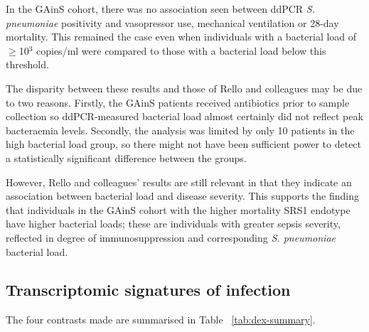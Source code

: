 In the GAinS cohort, there was no association seen between ddPCR \textit{S. pneumoniae} positivity and vasopressor use, mechanical ventilation or 28-day mortality. This remained the case even when individuals with a bacterial load of $\geq$10$^3$ copies/ml were compared to those with a bacterial load below this threshold. 

The disparity between these results and those of Rello and colleagues may be due to two reasons. Firstly, the GAinS patients received antibiotics prior to sample collection so ddPCR-measured bacterial load almost certainly did not reflect peak bacteraemia levels. Secondly, the analysis was limited by only 10 patients in the high bacterial load group, so there might not have been sufficient power to detect a statistically significant difference between the groups. 

However, Rello and colleagues' results are still relevant in that they indicate an association between bacterial load and disease severity. This supports the finding that individuals in the GAinS cohort with the higher mortality SRS1 endotype have higher bacterial loads; these are individuals with greater sepsis severity, reflected in degree of immunosuppression and corresponding \textit{S. pneumoniae} bacterial load.

\subsection{Transcriptomic signatures of infection}
The four contrasts made are summarised in Table ~\ref{tab:dex-summary}.

